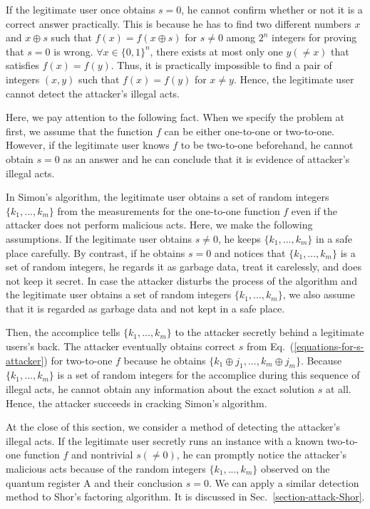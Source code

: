 \documentclass[12pt]{article}
\begin{document}
If the legitimate user once obtains $s=0$,
he cannot confirm
whether or not it is a correct answer practically.
This is because he has to find two different numbers $x$ and $x\oplus s$ such that $f(x)=f(x\oplus s)$ for $s\neq 0$
among $2^{n}$ integers for proving that $s=0$ is wrong.
$\forall x\in\{0,1\}^{n}$,
there exists at most only one $y(\neq x)$
that satisfies $f(x)=f(y)$.
Thus,
it is practically impossible to find a pair of integers $(x,y)$ such that $f(x)=f(y)$ for $x\neq y$.
Hence, the legitimate user cannot detect the attacker's illegal acts.

Here,
we pay attention to the following fact.
When we specify the problem at first,
we assume that the function $f$ can be either one-to-one or two-to-one.
However,
if the legitimate user knows $f$ to be two-to-one beforehand,
he cannot obtain $s=0$ as an answer and he can conclude that it is evidence of attacker's illegal acts.

In Simon's algorithm,
the legitimate user obtains a set of random integers $\{k_{1},...,k_{m}\}$
from the measurements for the one-to-one function $f$ even if the attacker does not perform malicious acts.
Here,
we make the following assumptions.
If the legitimate user obtains $s\neq 0$,
he keeps $\{k_{1},...,k_{m}\}$ in a safe place carefully.
By contrast,
if he obtains $s=0$ and notices that $\{k_{1},...,k_{m}\}$ is a set of random integers,
he regards it as garbage data,
treat it carelessly,
and does not keep it secret.
In case the attacker disturbs the process of the algorithm and the legitimate user obtains a set of random integers $\{k_{1},...,k_{m}\}$,
we also assume that it is regarded as garbage data and not kept in a safe place.

Then,
the accomplice tells $\{k_{1},...,k_{m}\}$ to the attacker secretly behind a legitimate users's back.
The attacker eventually obtains correct $s$ from Eq.~(\ref{equations-for-s-attacker})
for two-to-one $f$ because he obtains $\{k_{1}\oplus j_{1},...,k_{m}\oplus j_{m}\}$.
Because
$\{k_{1},...,k_{m}\}$ is a set of random integers for the accomplice
during this sequence of illegal acts,
he cannot obtain any information about the exact solution $s$ at all.
Hence,
the attacker succeeds in cracking Simon's algorithm.

At the close of this section,
we consider a method of detecting the attacker's illegal acts.
If the legitimate user secretly runs an instance with a known two-to-one function $f$ and nontrivial $s(\neq 0)$,
he can promptly notice the attacker's malicious acts because of the random integers $\{k_{1},...,k_{m}\}$
observed on the quantum register A and their conclusion $s=0$.
We can apply a similar detection method to Shor's factoring algorithm.
It is discussed in Sec.~\ref{section-attack-Shor}.
\end{document}
